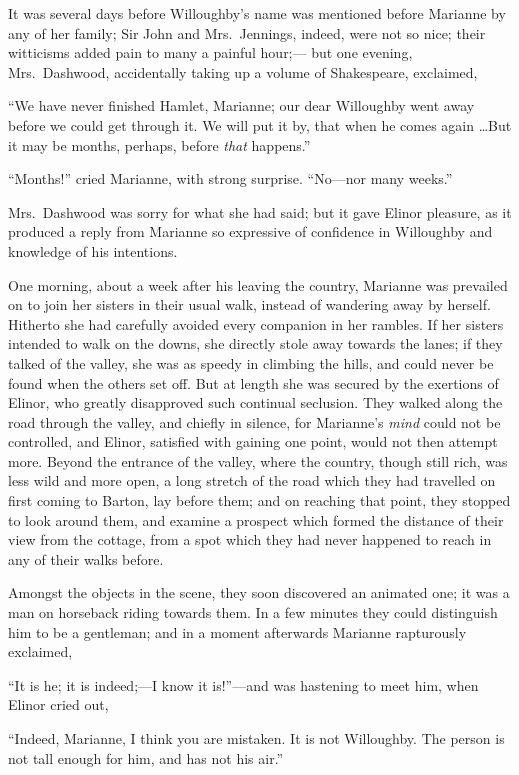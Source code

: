 \documentclass{article}
\begin{document}
It was several days before Willoughby's name
was mentioned before Marianne by any of her family;
Sir John and Mrs.\ Jennings, indeed, were not so nice;
their witticisms added pain to many a painful hour;---%
but one evening, Mrs.\ Dashwood, accidentally taking up a
volume of Shakespeare, exclaimed,

``We have never finished Hamlet, Marianne; our dear
Willoughby went away before we could get through it.
We will put it by, that when he comes again \ldots But it may
be months, perhaps, before \emph{that} happens.''

``Months!'' cried Marianne, with strong surprise.
``No---nor many weeks.''

Mrs.\ Dashwood was sorry for what she had said;
but it gave Elinor pleasure, as it produced a reply
from Marianne so expressive of confidence in Willoughby
and knowledge of his intentions.

One morning, about a week after his leaving the country,
Marianne was prevailed on to join her sisters in their
usual walk, instead of wandering away by herself.
Hitherto she had carefully avoided every companion in
her rambles.  If her sisters intended to walk on the downs,
she directly stole away towards the lanes; if they talked
of the valley, she was as speedy in climbing the hills,
and could never be found when the others set off.
But at length she was secured by the exertions of Elinor,
who greatly disapproved such continual seclusion.  They walked
along the road through the valley, and chiefly in silence,
for Marianne's \emph{mind} could not be controlled, and Elinor,
satisfied with gaining one point, would not then attempt more.
Beyond the entrance of the valley, where the country,
though still rich, was less wild and more open, a long
stretch of the road which they had travelled on first coming
to Barton, lay before them; and on reaching that point,
they stopped to look around them, and examine a prospect
which formed the distance of their view from the cottage,
from a spot which they had never happened to reach in any
of their walks before.

Amongst the objects in the scene, they soon discovered
an animated one; it was a man on horseback riding towards them.
In a few minutes they could distinguish him to be a gentleman;
and in a moment afterwards Marianne rapturously exclaimed,

``It is he; it is indeed;---I know it is!''---and was
hastening to meet him, when Elinor cried out,

``Indeed, Marianne, I think you are mistaken.  It is
not Willoughby.  The person is not tall enough for him,
and has not his air.''
\end{document}
